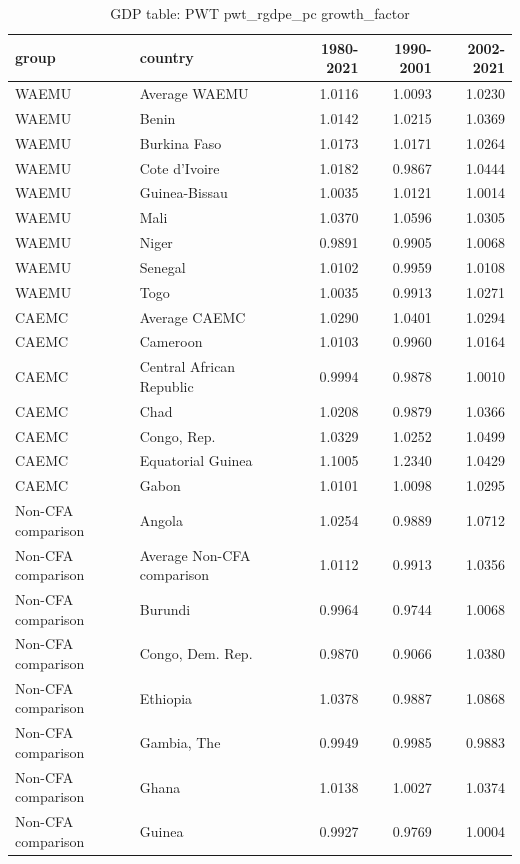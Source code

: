 \begin{table}

\caption{GDP table: PWT pwt_rgdpe_pc growth_factor}
\centering
\begin{tabular}[t]{llrrr}
\toprule
group & country & 1980-2021 & 1990-2001 & 2002-2021\\
\midrule
WAEMU & Average WAEMU & 1.0116 & 1.0093 & 1.0230\\
WAEMU & Benin & 1.0142 & 1.0215 & 1.0369\\
WAEMU & Burkina Faso & 1.0173 & 1.0171 & 1.0264\\
WAEMU & Cote d'Ivoire & 1.0182 & 0.9867 & 1.0444\\
WAEMU & Guinea-Bissau & 1.0035 & 1.0121 & 1.0014\\
\addlinespace
WAEMU & Mali & 1.0370 & 1.0596 & 1.0305\\
WAEMU & Niger & 0.9891 & 0.9905 & 1.0068\\
WAEMU & Senegal & 1.0102 & 0.9959 & 1.0108\\
WAEMU & Togo & 1.0035 & 0.9913 & 1.0271\\
CAEMC & Average CAEMC & 1.0290 & 1.0401 & 1.0294\\
\addlinespace
CAEMC & Cameroon & 1.0103 & 0.9960 & 1.0164\\
CAEMC & Central African Republic & 0.9994 & 0.9878 & 1.0010\\
CAEMC & Chad & 1.0208 & 0.9879 & 1.0366\\
CAEMC & Congo, Rep. & 1.0329 & 1.0252 & 1.0499\\
CAEMC & Equatorial Guinea & 1.1005 & 1.2340 & 1.0429\\
\addlinespace
CAEMC & Gabon & 1.0101 & 1.0098 & 1.0295\\
Non-CFA comparison & Angola & 1.0254 & 0.9889 & 1.0712\\
Non-CFA comparison & Average Non-CFA comparison & 1.0112 & 0.9913 & 1.0356\\
Non-CFA comparison & Burundi & 0.9964 & 0.9744 & 1.0068\\
Non-CFA comparison & Congo, Dem. Rep. & 0.9870 & 0.9066 & 1.0380\\
\addlinespace
Non-CFA comparison & Ethiopia & 1.0378 & 0.9887 & 1.0868\\
Non-CFA comparison & Gambia, The & 0.9949 & 0.9985 & 0.9883\\
Non-CFA comparison & Ghana & 1.0138 & 1.0027 & 1.0374\\
Non-CFA comparison & Guinea & 0.9927 & 0.9769 & 1.0004\\

\end{tabular}
\end{table}
